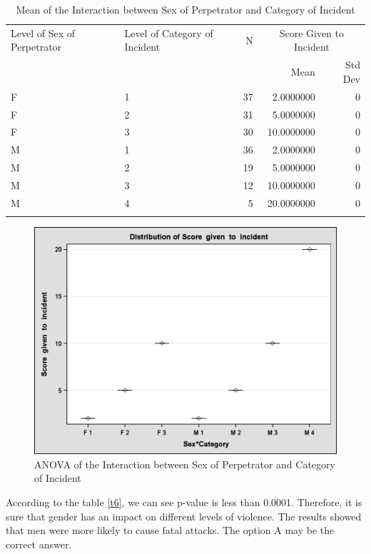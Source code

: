 \begin{table}[H]
\centering
\begin{longtable}{llrrr}
\toprule
   Level of {\newline} Sex of Perpetrator &    Level of {\newline} Category of Incident &    N &    \multicolumn{2}{c}{Score Given to Incident}\\

   ~ &    ~ &    ~ &    Mean &    Std Dev\\
\endhead
\midrule
   F &    1 &    37 &    2.0000000 &    0\\
   F &    2 &    31 &    5.0000000 &    0\\
   F &    3 &    30 &    10.0000000 &    0\\
   M &    1 &    36 &    2.0000000 &    0\\
   M &    2 &    19 &    5.0000000 &    0\\
   M &    3 &    12 &    10.0000000 &    0\\
   M &    4 &    5 &    20.0000000 &    0\\
\bottomrule
\caption{Mean of the Interaction between Sex of Perpetrator and Category of Incident}
\label{t7}

\end{longtable}
\end{table}

\begin{figure}[H]
\centering
\includegraphics[scale=0.25]{Pic/Q3/3.png}
\caption{ANOVA of the Interaction between Sex of Perpetrator and Category of Incident}
\label{f9}
\end{figure}

According to the table \ref{t6}, we can see p-value is less than 0.0001. Therefore, it is sure that gender has an impact on different levels of violence. The results showed that men were more likely to cause fatal attacks. The option A may be the correct answer.


